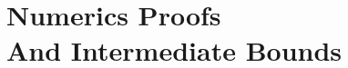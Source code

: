
\section[Numerics Proofs And Bounds]{Numerics Proofs\\And Intermediate Bounds}\label{app:numerics-proofs}
%
%
%
